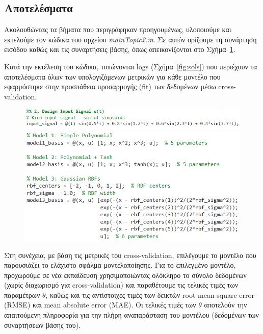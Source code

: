 \documentclass[12pt]{article} %
\numberwithin{equation}{section}  %
\begin{document}
\subsection{Αποτελέσματα}

Ακολουθώντας τα βήματα που περιγράφηκαν προηγουμένως, 
υλοποιούμε και εκτελούμε τον κώδικα του αρχείου \textit{mainTopic2.m}. 
Σε αυτόν ορίζουμε τη συνάρτηση εισόδου καθώς και τις συναρτήσεις βάσης, 
όπως απεικονίζονται στο Σχήμα~\ref{fig:eqs}.

Κατά την εκτέλεση του κώδικα, τυπώνονται logs (Σχήμα~\ref{fig:sols}) που περιέχουν τα αποτελέσματα 
όλων των υπολογιζόμενων μετρικών για κάθε μοντέλο που εφαρμόστηκε στην προσπάθεια προσαρμογής 
(fit) των δεδομένων μέσω cross-validation.


\begin{figure}[ht!]
    \centering
    \begin{minipage}{0.9\textwidth}
        \centering
        \includegraphics[width=0.7\linewidth]{plots/plotB_2_input_func.png}
    \end{minipage}
    
    \vspace{1em} %
    
    \centering
    \begin{minipage}{0.9\textwidth}
        \centering
        \includegraphics[width=0.705\linewidth]{plots/plotB_3_models.png}
    \end{minipage}

    \caption{}
    \label{fig:eqs}
\end{figure}

Στη συνέχεια, με βάση τις μετρικές του cross-validation, 
επιλέγουμε το μοντέλο που παρουσιάζει το ελάχιστο σφάλμα μοντελοποίησης. 
Για το επιλεγμένο μοντέλο, προχωρούμε σε νέα εκπαίδευση χρησιμοποιώντας ολόκληρο το σύνολο δεδομένων 
(χωρίς διαχωρισμό για cross-validation) και παραθέτουμε τις τελικές τιμές των παραμέτρων $\theta$, 
καθώς και τις αντίστοιχες τιμές των δεικτών root mean square error (RMSE) και mean absolute error (MAE). 
Οι τελικές τιμές των $\theta$ αποτελούν την απαιτούμενη πληροφορία για την πλήρη αναπαράσταση του μοντέλου (δεδομένων των συναρτήσεων βάσης του).
\end{document}
